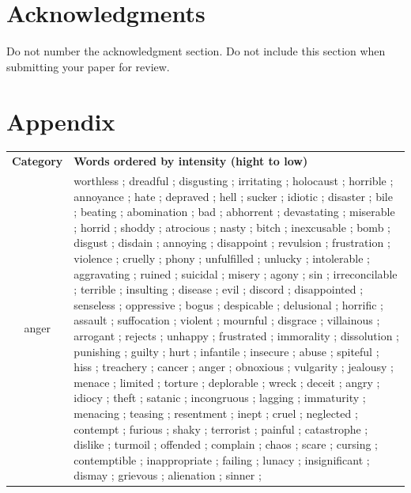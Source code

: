 \documentclass[11pt]{article}
\begin{document}
\section*{Acknowledgments}

Do not number the acknowledgment section. Do not include this section when submitting your paper for review.







\clearpage
\section*{Appendix}
\begin{table}[th]%
\begin{center}
\scriptsize
\begin{tabular}{c @{\hspace{0pt}}  @{\hspace{15pt}}p{}}
\toprule[.12em]\addlinespace
{\bf\small Category} & {\bf\small Words ordered by intensity (hight to low) } \\ \addlinespace
\midrule \addlinespace
anger & 
worthless	;
dreadful	;
disgusting	;
irritating	;
holocaust	;
horrible	;
annoyance	;
hate	;
depraved	;
hell	;
sucker	;
idiotic	;
disaster	;
bile	;
beating	;
abomination	;
bad	;
abhorrent	;
devastating	;
miserable	;
horrid	;
shoddy	;
atrocious	;
nasty	;
bitch	;
inexcusable	;
bomb	;
disgust	;
disdain	;
annoying	;
disappoint	;
revulsion	;
frustration	;
violence	;
cruelly	;
phony	;
unfulfilled	;
unlucky	;
intolerable	;
aggravating	;
ruined	;
suicidal	;
misery	;
agony	;
sin	;
irreconcilable	;
terrible	;
insulting	;
disease	;
evil	;
discord	;
disappointed	;
senseless	;
oppressive	;
bogus	;
despicable	;
delusional	;
horrific	;
assault	;
suffocation	;
violent	;
mournful	;
disgrace	;
villainous	;
arrogant	;
rejects	;
unhappy	;
frustrated	;
immorality	;
dissolution	;
punishing	;
guilty	;
hurt	;
infantile	;
insecure	;
abuse	;
spiteful	;
hiss	;
treachery	;
cancer	;
anger	;
obnoxious	;
vulgarity	;
jealousy	;
menace	;
limited	;
torture	;
deplorable	;
wreck	;
deceit	;
angry	;
idiocy	;
theft	;
satanic	;
incongruous	;
lagging	;
immaturity	;
menacing	;
teasing	;
resentment	;
inept	;
cruel	;
neglected	;
contempt	;
furious	;
shaky	;
terrorist	;
painful	;
catastrophe	;
dislike	;
turmoil	;
offended	;
complain	;
chaos	;
scare	;
cursing	;
contemptible	;
inappropriate	;
failing	;
lunacy	;
insignificant	;
dismay	;
grievous	;
alienation	;
sinner	;

\end{tabular}
\end{center}
\end{table}
\end{document}
